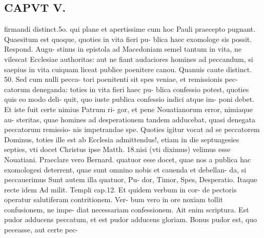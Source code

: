 \documentclass{article}
\begin{document}
\begin{pages}
\section*{CAPVT  V. }\pstart firmandi distinct.5o. qui plane et apertissime cum hoc Pauli praecepto pugnant. Quaesitum est quoque, quoties in vita fieri pu- blica haec exomologe sis possit. Respond. Augu- stinus in epistola ad Macedoniam semel tantum in vita, ne vilescat Ecclesiae authoritas: aut ne fiant audaciores homines ad peccandum, si saepius in vita cuiquam liceat publice poenitere canou. Quanuis caute distinct. 50. Sed cum nulli pecca- tori poenitenti sit spes veniae, et remissionis pec- catorum deneganda: toties in vita fieri haec pu- blica confessio potest, quoties quis eo modo deli- quit, quo iuste publica confessio indici atque im- poni debet. Et iste fuit certe nimius Patrum ri- gor, et pene Nouatianorum error, nimiaque au- steritas, quae homines ad desperationem tandem adducebat, quasi denegata peccatorum remissio- nis impetrandae spe. Quoties igitur vocat ad se peccatorem Dominus, toties ille est ab Ecclesia admittendus!, etiam in die septuagesies septies, vti docet Christus ipse Matth. 18.nisi (vti diximus) velimus esse Nouatiani. Praeclare vero Bernard. quatuor esse docet, quae nos a publica hac exomologesi deterrent, quae sunt omnino nobis et cauenda et debellan- da, si peccauerimus Sunt autem illa quatuor, Pu- dor, Timor, Spes, Desperatio. Itaque recte idem Ad milit. Templi cap.12. Et quidem verbum in cor- de pectoris operatur salutiferam contritionem. Ver- bum vero in ore noxiam tollit confusionem, ne impe- diat necessariam confessionem. Ait enim scriptura. Est pudor adducens peccatum, et est pudor adducens gloriam. Bonus pudor est, quo peceasse, aut certe pec-  \pend

\end{pages}
\end{document}
